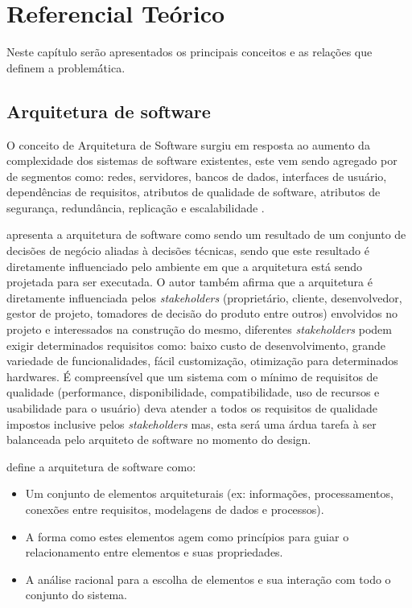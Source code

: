 \chapter{Referencial Teórico}
Neste capítulo serão apresentados os principais conceitos e as relações que definem a problemá́tica.
\section{Arquitetura de software}
O conceito de Arquitetura de Software surgiu em resposta ao aumento da complexidade dos sistemas de software existentes, este vem sendo agregado por de segmentos como: redes, servidores, bancos de dados, interfaces de usuário, dependências de requisitos, atributos de qualidade de software, atributos de segurança, redundância, replicação e escalabilidade \cite{hanschke2015integrating}.

\cite{bass2007software} apresenta a arquitetura de software como sendo um resultado de um conjunto de decisões de negócio aliadas à decisões técnicas, sendo que este resultado é diretamente influenciado pelo ambiente em que a arquitetura está sendo projetada para ser executada. O autor também afirma que a arquitetura é diretamente influenciada pelos \textit{stakeholders} (proprietário, cliente, desenvolvedor, gestor de projeto, tomadores de decisão do produto entre outros) envolvidos no projeto e interessados na construção do mesmo, diferentes \textit{stakeholders} podem exigir determinados requisitos como: baixo custo de desenvolvimento, grande variedade de funcionalidades, fácil customização, otimização para determinados hardwares. É compreensível que um sistema com o mínimo de requisitos de qualidade (performance, disponibilidade, compatibilidade, uso de recursos e usabilidade para o usuário) deva atender a todos os requisitos de qualidade impostos inclusive pelos \textit{stakeholders} mas, esta será uma árdua tarefa à ser balanceada pelo arquiteto de software no momento do design.

\cite{babar2014making} define a arquitetura de software como:
\begin{itemize}
\item Um conjunto de elementos arquiteturais (ex: informações, processamentos, conexões entre requisitos, modelagens de dados e processos).
\item A forma como estes elementos agem como princípios para guiar  o relacionamento entre elementos e suas propriedades.
\item A análise racional para a escolha de elementos e sua interação com todo o conjunto do sistema.
\end{itemize}  

